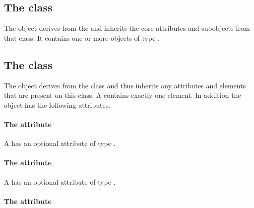 \subsection{The  class}
\label{listofgroups-class}


The \ListOfGroups object derives from the  and inherits the
core attributes and subobjects from that class. It contains one or more
objects of type \Group.

\subsection{The  class}
\label{group-class}




The \Group object derives from the \SBase class and thus inherits any
attributes and elements that are present on this class.
A \Group contains exactly one \ListOfMembers element.
In addition the \Group object has the following attributes.

\paragraph{The \fixttspace{} attribute}

A \Group has an optional attribute  of type .


\paragraph{The \fixttspace{} attribute}

A \Group has an optional attribute  of type
.


\paragraph{The \fixttspace{} attribute}

